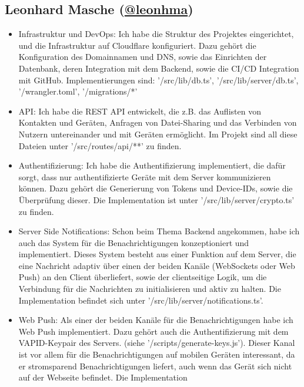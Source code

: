 \documentclass[a4paper]{article}
\begin{document}
\subsection{Leonhard Masche (\href{https://github.com/leonhma}{@leonhma})}
\begin{itemize}
  \item Infrastruktur und DevOps: Ich habe die Struktur des Projektes
        eingerichtet, und die Infrastruktur auf Cloudflare konfiguriert. Dazu
        gehört die Konfiguration des Domainnamen und DNS, sowie das Einrichten
        der Datenbank, deren Integration mit dem Backend, sowie die CI/CD
        Integration mit GitHub. Implementierungen sind: '/src/lib/db.ts',
        '/src/lib/server/db.ts', '/wrangler.toml', '/migrations/*'
  \item API: Ich habe die REST API entwickelt, die z.B. das Auflisten von
        Kontakten und Geräten, Anfragen von Datei-Sharing und das Verbinden von
        Nutzern untereinander und mit Geräten ermöglicht. Im Projekt sind all
        diese Dateien unter '/src/routes/api/**' zu finden.
  \item Authentifizierung: Ich habe die Authentifizierung implementiert, die
        dafür sorgt, dass nur authentifizierte Geräte mit dem Server
        kommunizieren können. Dazu gehört die Generierung von Tokens und
        Device-IDs, sowie die Überprüfung dieser. Die Implementation ist unter
        '/src/lib/server/crypto.ts' zu finden.
  \item Server Side Notifications: Schon beim Thema Backend angekommen, habe ich
        auch das System für die Benachrichtigungen konzeptioniert und
        implementiert. Dieses System besteht aus einer Funktion auf dem Server,
        die eine Nachricht adaptiv über einen der beiden Kanäle (WebSockets oder
        Web Push) an den Client überliefert, sowie der clientseitige Logik, um
        die Verbindung für die Nachrichten zu initialisieren und aktiv zu
        halten. Die Implementation befindet sich unter
        '/src/lib/server/notifications.ts'.
  \item Web Push: Als einer der beiden Kanäle für die Benachrichtigungen habe
        ich Web Push implementiert. Dazu gehört auch die Authentifizierung mit
        dem VAPID-Keypair des Servers. (siehe '/scripts/generate-keys.js').
        Dieser Kanal ist vor allem für die Benachrichtigungen auf mobilen
        Geräten interessant, da er stromsparend Benachrichtigungen liefert, auch
        wenn das Gerät sich nicht auf der Webseite befindet. Die Implementation

\end{itemize}
\end{document}
